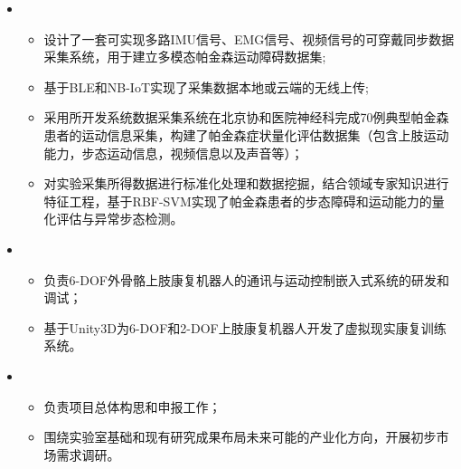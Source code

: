 \begin{itemize}[leftmargin=*]
    \item {}
    {\small
    \begin{itemize}
      \item 设计了一套可实现多路IMU信号、EMG信号、视频信号的可穿戴同步数据采集系统，用于建立多模态帕金森运动障碍数据集;
      \item 基于BLE和NB-IoT实现了采集数据本地或云端的无线上传;
      \item 采用所开发系统数据采集系统在北京协和医院神经科完成70例典型帕金森患者的运动信息采集，构建了帕金森症状量化评估数据集（包含上肢运动能力，步态运动信息，视频信息以及声音等）；
      \item 对实验采集所得数据进行标准化处理和数据挖掘，结合领域专家知识进行特征工程，基于RBF-SVM实现了帕金森患者的步态障碍和运动能力的量化评估与异常步态检测。
    \end{itemize}
    }
    \item {}
    {\small
    \begin{itemize}
      \item 负责6-DOF外骨骼上肢康复机器人的通讯与运动控制嵌入式系统的研发和调试；
      \item 基于Unity3D为6-DOF和2-DOF上肢康复机器人开发了虚拟现实康复训练系统。
    \end{itemize}
    }
    \item {}
    {\small
    \begin{itemize}
      \item 负责项目总体构思和申报工作；
      \item 围绕实验室基础和现有研究成果布局未来可能的产业化方向，开展初步市场需求调研。
    \end{itemize}
    }
  \end{itemize}
